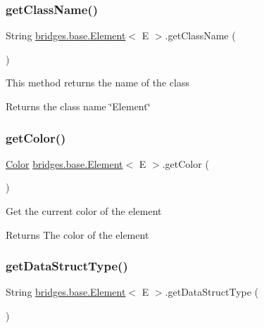 \subsubsection{\texorpdfstring{get\+Class\+Name()}{getClassName()}}
{\footnotesize\ttfamily String \hyperlink{classbridges_1_1base_1_1_element}{bridges.\+base.\+Element}$<$ E $>$.get\+Class\+Name (\begin{DoxyParamCaption}{ }\end{DoxyParamCaption})}

This method returns the name of the class \begin{DoxyReturn}{Returns}
the class name \char`\"{}\+Element\char`\"{} 
\end{DoxyReturn}
\mbox{\label{classbridges_1_1base_1_1_element_a6b80259f4f23b30df5486bf70f17c3b8}} 
\subsubsection{\texorpdfstring{get\+Color()}{getColor()}}
{\footnotesize\ttfamily \hyperlink{classbridges_1_1base_1_1_color}{Color} \hyperlink{classbridges_1_1base_1_1_element}{bridges.\+base.\+Element}$<$ E $>$.get\+Color (\begin{DoxyParamCaption}{ }\end{DoxyParamCaption})}

Get the current color of the element \begin{DoxyReturn}{Returns}
The color of the element 
\end{DoxyReturn}
\mbox{\label{classbridges_1_1base_1_1_element_a6a1b70fa4b1936d10c6deb433acf8cd9}} 
\subsubsection{\texorpdfstring{get\+Data\+Struct\+Type()}{getDataStructType()}}
{\footnotesize\ttfamily String \hyperlink{classbridges_1_1base_1_1_element}{bridges.\+base.\+Element}$<$ E $>$.get\+Data\+Struct\+Type (\begin{DoxyParamCaption}{ }\end{DoxyParamCaption})}



